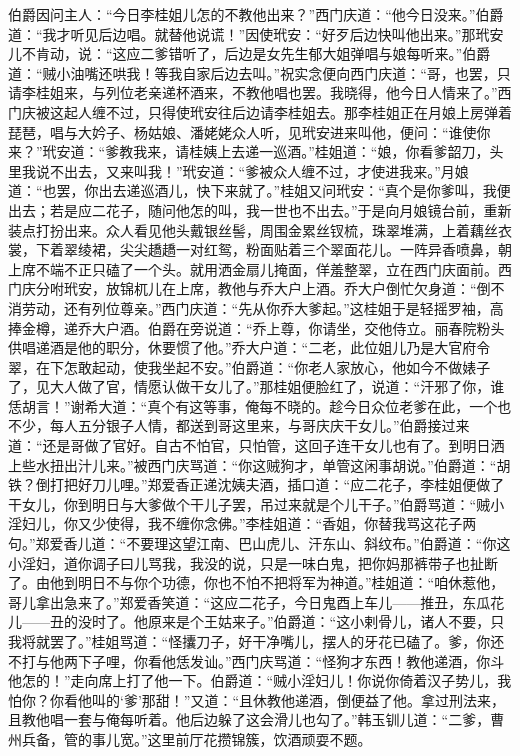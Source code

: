 伯爵因问主人：“今日李桂姐儿怎的不教他出来？”西门庆道：“他今日没来。”伯爵道：“我才听见后边唱。就替他说谎！”因使玳安：“好歹后边快叫他出来。”那玳安儿不肯动，说：“这应二爹错听了，后边是女先生郁大姐弹唱与娘每听来。”伯爵道：“贼小油嘴还哄我！等我自家后边去叫。”祝实念便向西门庆道：“哥，也罢，只请李桂姐来，与列位老亲递杯酒来，不教他唱也罢。我晓得，他今日人情来了。”西门庆被这起人缠不过，只得使玳安往后边请李桂姐去。那李桂姐正在月娘上房弹着琵琶，唱与大妗子、杨姑娘、潘姥姥众人听，见玳安进来叫他，便问：“谁使你来？”玳安道：“爹教我来，请桂姨上去递一巡酒。”桂姐道：“娘，你看爹韶刀，头里我说不出去，又来叫我！”玳安道：“爹被众人缠不过，才使进我来。”月娘道：“也罢，你出去递巡酒儿，快下来就了。”桂姐又问玳安：“真个是你爹叫，我便出去；若是应二花子，随问他怎的叫，我一世也不出去。”于是向月娘镜台前，重新装点打扮出来。众人看见他头戴银丝髻，周围金累丝钗梳，珠翠堆满，上着藕丝衣裳，下着翠绫裙，尖尖趫趫一对红鸳，粉面贴着三个翠面花儿。一阵异香喷鼻，朝上席不端不正只磕了一个头。就用洒金扇儿掩面，佯羞整翠，立在西门庆面前。西门庆分咐玳安，放锦杌儿在上席，教他与乔大户上酒。乔大户倒忙欠身道：“倒不消劳动，还有列位尊亲。”西门庆道：“先从你乔大爹起。”这桂姐于是轻摇罗袖，高捧金樽，递乔大户酒。伯爵在旁说道：“乔上尊，你请坐，交他侍立。丽春院粉头供唱递酒是他的职分，休要惯了他。”乔大户道：“二老，此位姐儿乃是大官府令翠，在下怎敢起动，使我坐起不安。”伯爵道：“你老人家放心，他如今不做婊子了，见大人做了官，情愿认做干女儿了。”那桂姐便脸红了，说道：“汗邪了你，谁恁胡言！”谢希大道：“真个有这等事，俺每不晓的。趁今日众位老爹在此，一个也不少，每人五分银子人情，都送到哥这里来，与哥庆庆干女儿。”伯爵接过来道：“还是哥做了官好。自古不怕官，只怕管，这回子连干女儿也有了。到明日洒上些水扭出汁儿来。”被西门庆骂道：“你这贼狗才，单管这闲事胡说。”伯爵道：“胡铁？倒打把好刀儿哩。”郑爱香正递沈姨夫酒，插口道：“应二花子，李桂姐便做了干女儿，你到明日与大爹做个干儿子罢，吊过来就是个儿干子。”伯爵骂道：“贼小淫妇儿，你又少使得，我不缠你念佛。”李桂姐道：“香姐，你替我骂这花子两句。”郑爱香儿道：“不要理这望江南、巴山虎儿、汗东山、斜纹布。”伯爵道：“你这小淫妇，道你调子曰儿骂我，我没的说，只是一味白鬼，把你妈那裤带子也扯断了。由他到明日不与你个功德，你也不怕不把将军为神道。”桂姐道：“咱休惹他，哥儿拿出急来了。”郑爱香笑道：“这应二花子，今日鬼酉上车儿——推丑，东瓜花儿——丑的没时了。他原来是个王姑来子。”伯爵道：“这小\textShouWai 剌骨儿，诸人不要，只我将就罢了。”桂姐骂道：“怪攮刀子，好干净嘴儿，摆人的牙花已磕了。爹，你还不打与他两下子哩，你看他恁发讪。”西门庆骂道：“怪狗才东西！教他递酒，你斗他怎的！”走向席上打了他一下。伯爵道：“贼小淫妇儿！你说你倚着汉子势儿，我怕你？你看他叫的‘爹’那甜！”又道：“且休教他递酒，倒便益了他。拿过刑法来，且教他唱一套与俺每听着。他后边躲了这会滑儿也勾了。”韩玉钏儿道：“二爹，曹州兵备，管的事儿宽。”这里前厅花攒锦簇，饮酒顽耍不题。


